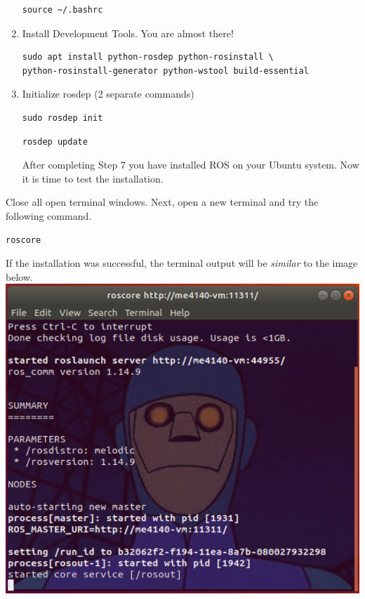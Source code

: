 \documentclass[12pt]{article}
\begin{document}
\begin{description}
\begin{enumerate}
\begin{verbatim} 
source ~/.bashrc 
\end{verbatim}

\item Install Development Tools. You are almost there! 
\begin{verbatim} 
sudo apt install python-rosdep python-rosinstall \ 
python-rosinstall-generator python-wstool build-essential
\end{verbatim}

	\item Initialize rosdep (2 separate commands) 
	\begin{verbatim}
sudo rosdep init
	\end{verbatim}
	
	\begin{verbatim} 
rosdep update
	\end{verbatim}


		


After completing Step 7 you have installed ROS on your Ubuntu system. Now it is time to test the installation. 
\end{enumerate}

\newpage

\item[\textbf{\underline{Test ROS Installation}}]

\item Close all open terminal windows. Next, open a new terminal and try the following command.\\
\begin{verbatim}  
roscore
\end{verbatim}

If the installation was successful, the terminal output will be {\it similar} to the image below. \vspace{3mm}\\

\includegraphics[scale=1]{roscore_charlie.png} \vspace{2mm}\\


\end{description}
\end{document}

